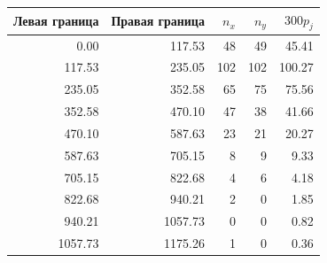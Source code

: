 \begin{tabular}{rrrrr}\toprule
Левая граница & Правая граница & $n_x$ & $n_y$ & $300p_j$ \\\midrule
0.00 & 117.53 & 48 & 49 & 45.41 \\
117.53 & 235.05 & 102 & 102 & 100.27 \\
235.05 & 352.58 & 65 & 75 & 75.56 \\
352.58 & 470.10 & 47 & 38 & 41.66 \\
470.10 & 587.63 & 23 & 21 & 20.27 \\
587.63 & 705.15 & 8 & 9 & 9.33 \\
705.15 & 822.68 & 4 & 6 & 4.18 \\
822.68 & 940.21 & 2 & 0 & 1.85 \\
940.21 & 1057.73 & 0 & 0 & 0.82 \\
1057.73 & 1175.26 & 1 & 0 & 0.36 \\
\bottomrule\end{tabular}